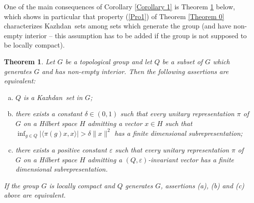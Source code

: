 \documentclass[11pt,english,a4paper]{smfart}
\numberwithin{equation}{section}
\newtheorem{theorem}{Theorem}[section]
\theoremstyle{definition}
\begin{document}
One of the main consequences of Corollary \ref{Corollary 1} is Theorem 
\ref{Theorem 2} below, which shows in particular that property (\ref{Pro1}) of Theorem 
\ref{Theorem 0} characterizes {Kazhdan}\ sets among sets which generate the 
group (and have non-empty interior -- this assumption has to be added if the group is not supposed to be locally compact).

\begin{theorem}\label{Theorem 2}
Let $G$ be a topological group and let ${Q}$ be a subset of $G$ which 
generates $G$ and has non-empty interior. Then the following assertions are equivalent:
\begin{enumerate}[(a)]
\item ${Q}$ is a {Kazhdan}\ set in $G$;\label{aa}

\item there exists a constant $\delta\in (0,1)$ such that every unitary representation $\pi$ of $G$ on a Hilbert space $H$ admitting a vector $x\in H$ such that $\inf_{g\in{Q}}\left|{\ensuremath{{\langle {\pi(g)x},{x}\rangle}}}\right| > \delta\|x\|^2$ has a finite dimensional subrepresentation;\label{bb}

\item there exists a positive constant $\varepsilon $ such that every unitary 
representation $\pi $ of $G$ on a Hilbert space $H$ admitting a 
$({Q},\varepsilon )$-invariant vector has a finite dimensional 
subrepresentation.\label{cc}
\end{enumerate}
If the group $G$ is locally compact and ${Q}$ generates $G$, assertions (a), (b) and (c) above are equivalent.
\end{theorem}
\end{document}
